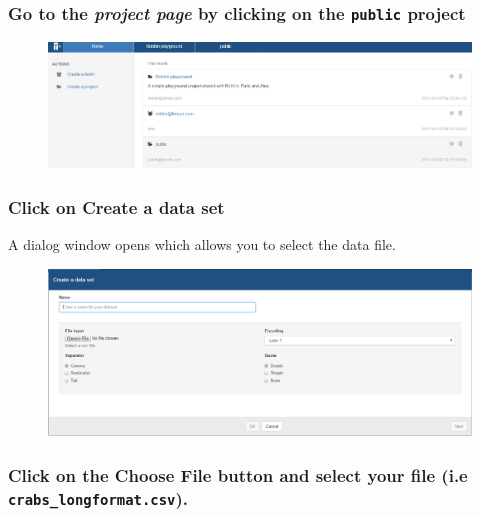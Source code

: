 \documentclass[]{book}
\theoremstyle{definition}
\theoremstyle{definition}
\theoremstyle{remark}
\begin{document}
\subsubsection{\texorpdfstring{Go to the \emph{project page} by clicking
on the \texttt{public}
project}{Go to the project page by clicking on the public project}}\label{go-to-the-project-page-by-clicking-on-the-public-project}

\begin{figure}[htbp]
\centering
\includegraphics{images/project_home.png}
\caption{}
\end{figure}

\subsubsection{\texorpdfstring{Click on \textbf{Create a data
set}}{Click on Create a data set}}\label{click-on-create-a-data-set}

A dialog window opens which allows you to select the data file.

\begin{figure}[htbp]
\centering
\includegraphics{images/create_dataset.png}
\caption{}
\end{figure}

\subsubsection{\texorpdfstring{Click on the \textbf{Choose File} button
and select your file (i.e
\texttt{crabs\_longformat.csv}).}{Click on the Choose File button and select your file (i.e crabs\_longformat.csv).}}\label{click-on-the-choose-file-button-and-select-your-file-i.e-crabs_longformat.csv.}
\end{document}
